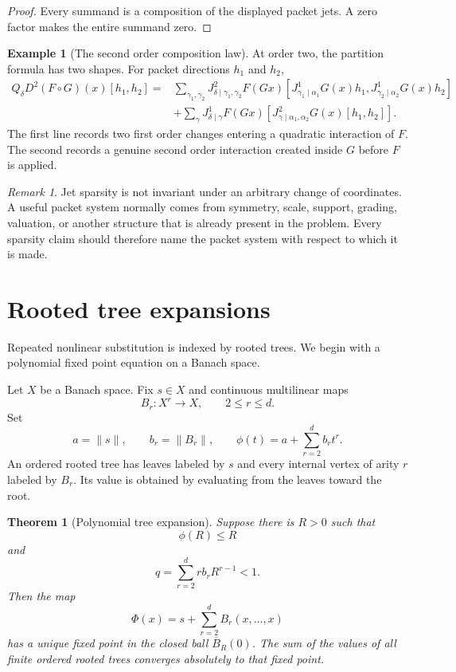 \documentclass{aomart}
\newtheorem{theorem}{Theorem}[section]
\theoremstyle{definition}
\newtheorem{example}[example]{Example}
\theoremstyle{remark}
\newtheorem{remark}[remark]{Remark}
\begin{document}
\begin{proof}
Every summand is a composition of the displayed packet jets.  A zero factor makes the entire summand zero.
\end{proof}


\begin{example}[The second order composition law]\label{ex:second_order_composition}
At order two, the partition formula has two shapes.  For packet directions $h_1$ and $h_2$,
\[
\begin{aligned}
Q_\delta D^2(F\circ G)(x)[h_1,h_2]
={}&
\sum_{\gamma_1,\gamma_2}
J^2_{\delta\mid\gamma_1,\gamma_2}F(Gx)
[J^1_{\gamma_1\mid\alpha_1}G(x)h_1,J^1_{\gamma_2\mid\alpha_2}G(x)h_2]\\
&+
\sum_\gamma
J^1_{\delta\mid\gamma}F(Gx)
[J^2_{\gamma\mid\alpha_1,\alpha_2}G(x)[h_1,h_2]].
\end{aligned}
\]
The first line records two first order changes entering a quadratic interaction of $F$.  The second records a genuine second order interaction created inside $G$ before $F$ is applied.
\end{example}

\begin{remark}\label{rem:jet_coordinate_dependence}
Jet sparsity is not invariant under an arbitrary change of coordinates.  A useful packet system normally comes from symmetry, scale, support, grading, valuation, or another structure that is already present in the problem.  Every sparsity claim should therefore name the packet system with respect to which it is made.
\end{remark}

\section{Rooted tree expansions}\label{sec:trees}

Repeated nonlinear substitution is indexed by rooted trees.  We begin with a polynomial fixed point equation on a Banach space.

Let $X$ be a Banach space.  Fix $s\in X$ and continuous multilinear maps
\[
B_r:X^r\longrightarrow X,
\qquad
2\le r\le d.
\]
Set
\[
a=\|s\|,
\qquad
b_r=\|B_r\|,
\qquad
\phi(t)=a+\sum_{r=2}^{d}b_rt^r.
\]
An ordered rooted tree has leaves labeled by $s$ and every internal vertex of arity $r$ labeled by $B_r$.  Its value is obtained by evaluating from the leaves toward the root.

\begin{theorem}[Polynomial tree expansion]\label{thm:polynomial_tree_expansion}
Suppose there is $R>0$ such that
\[
\phi(R)\le R
\]
and
\[
q=
\sum_{r=2}^{d}r b_rR^{r-1}<1.
\]
Then the map
\[
\Phi(x)=s+\sum_{r=2}^{d}B_r(x,\ldots,x)
\]
has a unique fixed point in the closed ball $\overline B_R(0)$.  The sum of the values of all finite ordered rooted trees converges absolutely to that fixed point.
\end{theorem}
\end{document}
